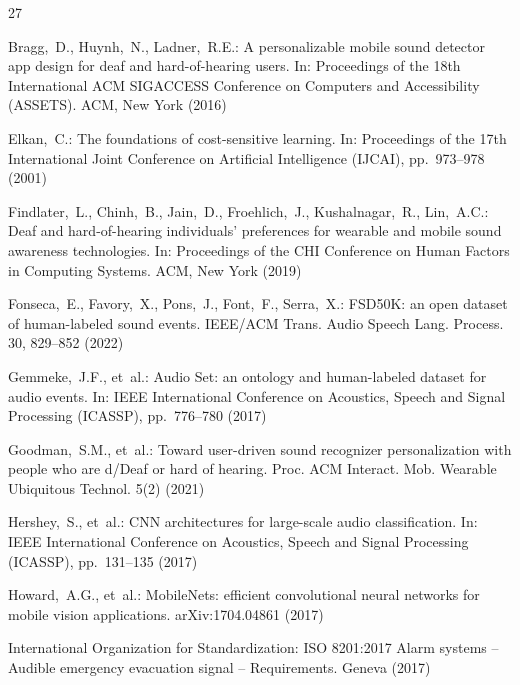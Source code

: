 \documentclass{svproc}
\begin{document}
\begin{thebibliography}{27}

Bragg,~D., Huynh,~N., Ladner,~R.E.: A personalizable mobile sound detector app design for deaf and hard-of-hearing users. In: Proceedings of the 18th International ACM SIGACCESS Conference on Computers and Accessibility (ASSETS). ACM, New York (2016)

Elkan,~C.: The foundations of cost-sensitive learning. In: Proceedings of the 17th International Joint Conference on Artificial Intelligence (IJCAI), pp.~973--978 (2001)

Findlater,~L., Chinh,~B., Jain,~D., Froehlich,~J., Kushalnagar,~R., Lin,~A.C.: Deaf and hard-of-hearing individuals' preferences for wearable and mobile sound awareness technologies. In: Proceedings of the CHI Conference on Human Factors in Computing Systems. ACM, New York (2019)

Fonseca,~E., Favory,~X., Pons,~J., Font,~F., Serra,~X.: FSD50K: an open dataset of human-labeled sound events. IEEE/ACM Trans. Audio Speech Lang. Process. 30, 829--852 (2022)

Gemmeke,~J.F., et~al.: Audio Set: an ontology and human-labeled dataset for audio events. In: IEEE International Conference on Acoustics, Speech and Signal Processing (ICASSP), pp.~776--780 (2017)

Goodman,~S.M., et~al.: Toward user-driven sound recognizer personalization with people who are d/Deaf or hard of hearing. Proc. ACM Interact. Mob. Wearable Ubiquitous Technol. 5(2) (2021)

Hershey,~S., et~al.: CNN architectures for large-scale audio classification. In: IEEE International Conference on Acoustics, Speech and Signal Processing (ICASSP), pp.~131--135 (2017)

Howard,~A.G., et~al.: MobileNets: efficient convolutional neural networks for mobile vision applications. arXiv:1704.04861 (2017)

International Organization for Standardization: ISO 8201:2017 Alarm systems -- Audible emergency evacuation signal -- Requirements. Geneva (2017)


\end{thebibliography}
\end{document}
